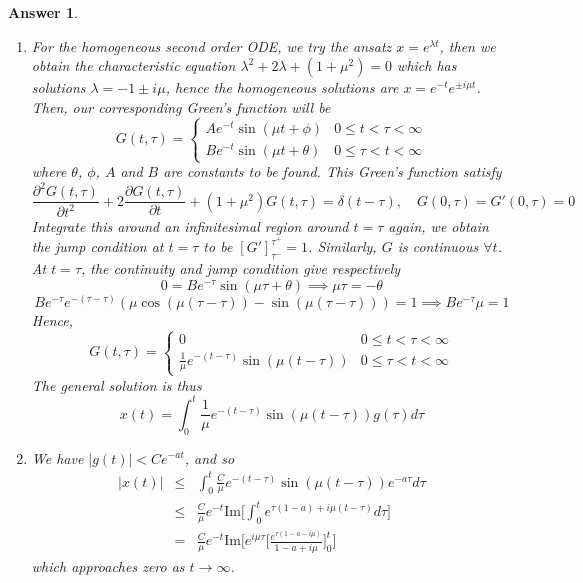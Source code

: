 \documentclass[a4paper]{article}
\newtheorem{ans}{Answer}[section]
\theoremstyle{new}
\begin{document}
\begin{ans}
\begin{enumerate}[label=(\alph*)]
\begin{enumerate}[label=(\roman*)]
    \item For the homogeneous second order ODE, we try the ansatz $x=e^{\lambda t}$, then we obtain the characteristic equation $\lambda^2+2\lambda+(1+\mu^2)=0$ which has solutions $\lambda=-1\pm i\mu$, hence the homogeneous solutions are $x=e^{-t}e^{\pm i\mu t}$. Then, our corresponding Green's function will be
        $$ G(t,\tau)=
\left\{
        \begin{array}{ll}
      Ae^{-t}\sin(\mu t+\phi) & 0\leq t<\tau<\infty\\
      Be^{-t}\sin(\mu t+\theta) &0\leq\tau< t<\infty
        \end{array}
    \right.$$
    where $\theta$, $\phi$, $A$ and $B$ are constants to be found. This Green's function satisfy
    $$\frac{\partial^2G(t,\tau)}{\partial t^2}+2\frac{\partial G(t,\tau)}{\partial t}+(1+\mu^2)G(t,\tau)=\delta(t-\tau),\quad G(0,\tau)=G'(0,\tau)=0$$
    Integrate this around an infinitesimal region around $t=\tau$ again, we obtain the jump condition at $t=\tau$ to be $[G']_{\tau^-}^{\tau^+}=1$. Similarly, $G$ is continuous $\forall t$. At $t=\tau$, the continuity and jump condition give respectively $$0=Be^{-\tau}\sin(\mu\tau+\theta)\implies\mu\tau=-\theta$$
    $$B e^{-\tau} e^{-(\tau-\tau)}(\mu\cos(\mu(\tau-\tau))-\sin(\mu(\tau-\tau)))=1\implies Be^{-\tau}\mu=1$$
    Hence, 
     $$ G(t,\tau)=
\left\{
        \begin{array}{ll}
      0 & 0\leq t<\tau<\infty\\
      \frac{1}{\mu}e^{-(t-\tau)}\sin(\mu(t-\tau)) &0\leq\tau< t<\infty
        \end{array}
    \right.$$
    The general solution is thus
$$x(t)=\int_0^t\frac{1}{\mu}e^{-(t-\tau)}\sin(\mu(t-\tau))g(\tau)d\tau$$
\item We have $|g(t)|<Ce^{-at}$, and so 
\begin{eqnarray}
|x(t)|&\leq&\int_0^t\frac{C}{\mu}e^{-(t-\tau)}\sin(\mu(t-\tau))e^{-a\tau}d\tau\nonumber\\&\leq&\frac{C}{\mu}e^{-t}\text{Im}\bigg[\int_0^te^{\tau(1-a)+i\mu(t-\tau)}d\tau\bigg]\nonumber\\&=&\frac{C}{\mu}e^{-t}\text{Im}\bigg[e^{i\mu\tau}\bigg[\frac{e^{\tau(1-a-i\mu)}}{1-a+i\mu}\bigg]_0^t\bigg]\nonumber
\end{eqnarray}
which approaches zero as $t\rightarrow\infty$.
\end{enumerate}
\end{enumerate}
\end{ans}
\newpage
\end{document}
